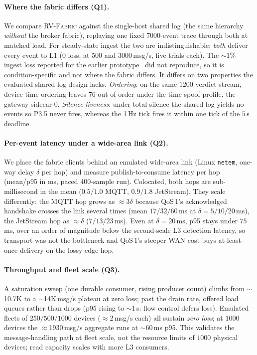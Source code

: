 \documentclass[runningheads]{llncs}
\newcommand{\sys}{\textsc{RV-Fabric}\xspace}
\begin{document}
\paragraph{Where the fabric differs (Q1).}
We compare \sys against the single-host shared log (the same hierarchy \emph{without} the
broker fabric), replaying one fixed $7000$-event trace through both at matched load. For
steady-state ingest the two are indistinguishable: \emph{both} deliver every event to L1
($0$ loss, at $500$ and $3000$\,msg/s, five trials each).
The $\sim$1\% ingest loss reported for the earlier prototype~\cite{ares2026} did not
reproduce, so it is condition-specific and not where the fabric differs. It differs on
two properties the evaluated shared-log design lacks. \emph{Ordering}: on the
same $1200$-verdict stream, device-time ordering leaves $76$ out of order under the
time-spoof profile, the gateway sidecar $0$. \emph{Silence-liveness}: under total silence the shared log yields no events so P3.5 never
fires, whereas the 1\,Hz tick fires it within one tick of the $5$\,s deadline.

\paragraph{Per-event latency under a wide-area link (Q2).}
We place the fabric clients behind an emulated wide-area link (Linux \texttt{netem},
one-way delay $\delta$ per hop) and measure publish-to-consume latency per hop (mean/p95
in ms, paced 400-sample run). Colocated, both hops are sub-millisecond in the mean ($0.5/1.0$ MQTT,
$0.9/1.8$ JetStream). They scale differently: the MQTT hop grows as ${\approx}3\delta$
because QoS\,1's acknowledged handshake crosses the link several times (mean $17/32/60$\,ms
at $\delta{=}5/10/20$\,ms), the JetStream hop as ${\approx}\delta$ ($7/13/23$\,ms). Even at
$\delta{=}20$\,ms, p95 stays under $75$\,ms, over an order of magnitude below the
second-scale L3 detection latency, so transport was not the bottleneck and QoS\,1's
steeper WAN cost buys at-least-once delivery on the lossy edge hop.

\paragraph{Throughput and fleet scale (Q3).}
A saturation sweep (one durable consumer, rising producer count) climbs from
$\sim$10.7K to a $\sim$14K\,msg/s plateau at zero loss; past the drain rate, offered
load queues rather than drops (p95 rising to $\sim$1\,s: flow control defers loss).
Emulated fleets of $250/500/1000$ devices ($\approx$2\,msg/s each) all sustain
\emph{zero loss}; at $1000$ devices the $\approx$1930\,msg/s aggregate runs at
$\sim$60\,ms p95. This validates the message-handling path at fleet scale, not the
resource limits of $1000$ physical devices; read capacity scales with more L3 consumers.
\end{document}
